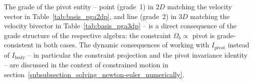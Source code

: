 The grade of the pivot entity -- point (grade~1) in $2D$ matching the velocity vector in
Table~\ref{tab:basis_pga2dp}, and line (grade~2) in $3D$ matching the velocity bivector
in Table~\ref{tab:basis_pga3dp} -- is a direct consequence of the grade structure of the
respective algebra: the constraint $\Omega_b \propto$ pivot is grade-consistent in both
cases. The dynamic consequences of working with $I_\text{pivot}$ instead of $I_\text{body}$
-- in particular the constraint projection and the pivot invariance identity -- are
discussed in the context of constrained motion in
section~\ref{subsubsection_solving_newton-euler_numerically}. \\

\newpage